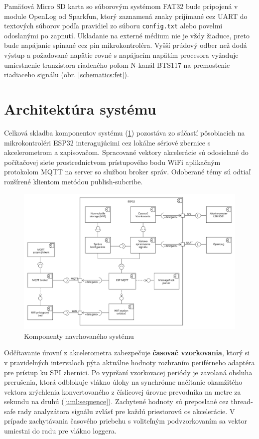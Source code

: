 Pamäťová Micro SD karta so súborovým systémom FAT32 bude pripojená v module OpenLog od Sparkfun, ktorý zaznamená znaky
prijímané cez UART do textových súborov podľa pravidiel zo súboru \verb|config.txt| alebo povelmi odoslanými
po zapnutí. Ukladanie na externé médium nie je vždy žiaduce, preto bude napájanie spínané cez pin mikrokontroléra. Vyšší
prúdový odber než dodá výstup a požadované napätie rovné s napájacím napätím procesora vyžaduje umiestnenie tranzistora riadeného
poľom N-kanál BTS117 na premostenie riadiaceho signálu (obr. \ref{schematics:fet}).


\section{Architektúra systému}
Celková skladba komponentov systému (\ref{uml:component}) pozostáva zo súčastí pôsobiacich na mikrokontroléri ESP32
interagujúcimi cez lokálne sériové zbernice s akcelerometrom a zapisovačom. Spracované vektory akcelerácie sú
odosielané do počítačovej siete prostredníctvom prístupového bodu WiFi aplikačným protokolom MQTT
na server so službou broker správ. Odoberané témy sú odtiaľ rozšírené klientom metódou publish-subcribe.
\begin{figure}[h]
	\centering
	\includegraphics[width=\textwidth]{figures/design/components.png}
	\caption{Komponenty navrhovaného systému}
	\label{uml:component}
\end{figure}

Odčítavanie úrovní z akcelerometra zabezpečuje \textbf{časovač vzorkovania}, ktorý si v pravidelných intervaloch pýta aktuálne
hodnoty rozhraním periférneho adaptéra pre prístup ku SPI zbernici. Po vypršaní vzorkovacej periódy je zavolaná obsluha prerušenia, ktorá
odblokuje vlákno úlohy na synchrónne načítanie okamžitého vektora zrýchlenia konvertovaného z číslicovej úrovne prevodníka na metre za
sekundu na druhú (\ref{uml:sequence}). Zachytené hodnoty sú preposlané cez thread-safe rady analyzátora signálu zvlásť pre každú
priestorovú os akcelerácie. V prípade zachytávania časového priebehu s voliteľným podvzorkovaním sa vektor umiestni do radu pre
vlákno loggera.

